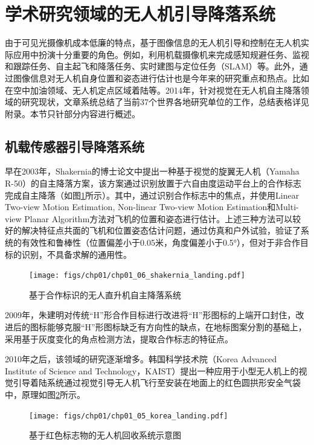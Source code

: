 \section{学术研究领域的无人机引导降落系统}
由于可见光摄像机成本低廉的特点，基于图像信息的无人机引导和控制在无人机实际应用中扮演十分重要的角色。例如，利用机载摄像机来完成感知规避任务\cite{mejias2010vision}、监视和跟踪任务\cite{campoy2009computer}\cite{mejias2006visual}、自主起飞和降落任务\cite{saripalli2002vision}、实时建图与定位任务（SLAM）\cite{weiss2011monocular}等。此外，通过图像信息对无人机自身位置和姿态进行估计也是今年来的研究重点和热点。比如在空中加油领域、无人机定点区域着陆等。2014年，针对视觉在无人机自主降落领域的研究现状，文章\cite{kong2014vision}系统总结了当前37个世界各地研究单位的工作，总结表格详见附录。本节只针部分内容进行概述。

\subsection{机载传感器引导降落系统} 

早在2003年，Shakernia\cite{shakernia2003vision}的博士论文中提出一种基于视觉的旋翼无人机（Yamaha R-50）的自主降落方案，该方案通过识别放置于六自由度运动平台上的合作标志完成自主降落（如图\ref{fig:chp01_06_shakernia_landing}所示）。其中，通过识别合作标志中的焦点，并使用Linear Two-view Motion Estimation, Non-linear Two-view Motion Estimation和Multi-view Planar Algorithm方法对飞机的位置和姿态进行估计。上述三种方法可以较好的解决特征点共面的飞机和位置姿态估计问题，通过仿真和户外试验，验证了系统的有效性和鲁棒性（位置偏差小于0.05米，角度偏差小于0.5°），但对于非合作目标的识别，不具备求解的通用性。

\begin{figure}[!tb]   
	\centering	
	\texttt{[image: figs/chp01/chp01\_06\_shakernia\_landing.pdf]}
	\caption{基于合作标识的无人直升机自主降落系统\cite{shakernia2003vision}}
	\label{fig:chp01_06_shakernia_landing}
\end{figure}


2009年，朱建明\cite{Zhu_Master_2009}对传统“H”形合作目标进行改进将“H”形图标的上端开口封住，改进后的图标能够克服“H”形图标缺乏有方向性的缺点，在地标图案分割的基础上，采用基于灰度变化的角点检测方法，提取合作标志的特征点。

2010年之后，该领域的研究逐渐增多。韩国科学技术院（Korea Advanced Institute of Science and Technology，KAIST）提出一种应用于小型无人机上的视觉引导着陆系统通过视觉引导无人机飞行至安装在地面上的红色圆拱形安全气袋中\cite{huh2010vision}，原理如图\ref{fig:chp01_05_korea_landing}所示。
\begin{figure}[!tb]   
	\centering	
	\texttt{[image: figs/chp01/chp01\_05\_korea\_landing.pdf]}
	\caption{基于红色标志物的无人机回收系统示意图\cite{huh2010vision}}
	\label{fig:chp01_05_korea_landing}
\end{figure}

